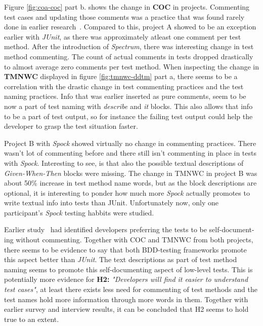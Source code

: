 Figure \ref{fig:coa-coc} part b. shows the change in \textbf{COC} in projects. Commenting test cases and updating those
comments was a practice that was found rarely done in earlier research~\cite{li2016automatically}. Compared to this,
project A showed to be an exception earlier with \textit{JUnit}, as there was approximately atleast one comment per test method.
After the introduction of \textit{Spectrum}, there was interesting change in test method commenting. The count of actual comments
in tests dropped drastically to almost average zero comments per test method. When inspecting the change in \textbf{TMNWC}
displayed in figure \ref{fig:tmnwc-ddtm} part a, there seems to be a correlation with the drastic change in test commenting
practices and the test naming practices. Info that was earlier inserted as pure comments, seem to be now a part of test
naming with \textit{describe} and \textit{it} blocks. This also allows that info to be a part of test output, so for instance
the failing test output could help the developer to grasp the test situation faster.

Project B with \textit{Spock} showed virtually no change in commenting practices. There wasn't lot of commenting before and there still isn't
commenting in place in tests with \textit{Spock}. Interesting to see, is that also the possible textual descriptions of \textit{Given-When-Then} blocks
were missing. The change in TMNWC in project B was about 50\% increase in test method name words, but as the block descriptions
are optional, it is interesting to ponder how much more \textit{Spock} actually promotes to write textual info into tests than
JUnit. Unfortunately now, only one participant's \textit{Spock} testing habbits were studied.

Earlier study~\cite{li2016automatically} had identified developers preferring the tests to be self-document- ing without commenting.
Together with COC and TMNWC from both projects, there seems to be evidence to say that both BDD-testing frameworks
promote this aspect better than \textit{JUnit}. The text descriptions as part of test method naming seems to promote this self-documenting
aspect of low-level tests. This is potentially more evidence for \textbf{H2:} \textit{"Developers will find it easier to understand test cases"}, at least
there exists less need for commenting of test methods and the test names hold more information through more words in them.
Together with earlier survey and interview results, it can be concluded that H2 seems to hold true to an extent.

